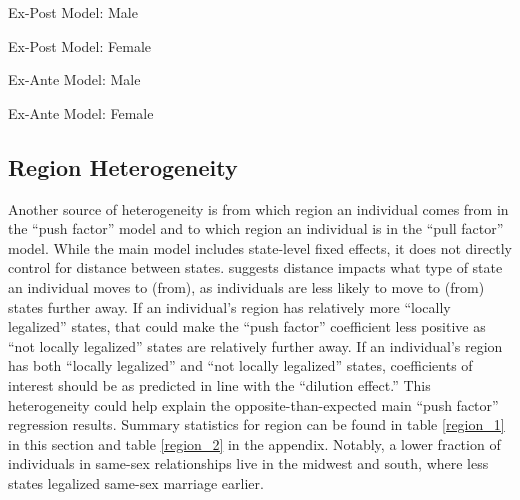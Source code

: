 \documentclass[12pt,letterpaper]{article}
\begin{document}
\clearpage %
\begin{table}[p] %
    \centering
    \caption{Ex-Post Model: Male}
    \label{tab: male_expost_model}
    
\end{table}
\begin{table}[p]
    \centering
    \caption{Ex-Post Model: Female}
    \label{tab: female_expost_model}
    
\end{table}
\begin{table}[p] %
    \centering
    \caption{Ex-Ante Model: Male}
    \label{tab: male_exante_model}
    
\end{table}
\begin{table}[p] %
    \centering
    \caption{Ex-Ante Model: Female}
    \label{tab: female_exante_model}
    
\end{table}

\clearpage
\subsection{Region Heterogeneity}

Another source of heterogeneity is from which region an individual comes from in the “push factor” model and to which region an individual is in the “pull factor” model. While the main model includes state-level fixed effects, it does not directly control for distance between states. \citep{1} suggests distance impacts what type of state an individual moves to (from), as individuals are less likely to move to (from) states further away. If an individual’s region has relatively more “locally legalized” states, that could make the  “push factor” coefficient less positive as “not locally legalized” states are relatively further away. If an individual’s region has both “locally legalized” and “not locally legalized” states, coefficients of interest should be as predicted in line with the “dilution effect.” This heterogeneity could help explain the opposite-than-expected main “push factor” regression results. Summary statistics for region can be found in table \ref{region_1} in this section and table \ref{region_2} in the appendix. Notably, a lower fraction of individuals in same-sex relationships live in the midwest and south, where less states legalized same-sex marriage earlier.
\end{document}

